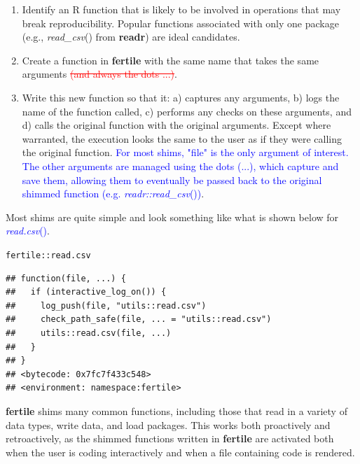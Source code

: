 \documentclass[APA,LATO1COL]{WileyNJD-v2}\usepackage[]{graphicx}\usepackage[]{color}
\makeatletter
\newcommand{\hlopt}[1]{\textcolor[rgb]{0,0,0}{#1}}%
\newcommand{\hlstd}[1]{\textcolor[rgb]{0.345,0.345,0.345}{#1}}%
\newenvironment{kframe}{%
 \def\at@end@of@kframe{}%
 \ifinner\ifhmode%
  \def\at@end@of@kframe{\end{minipage}}%
  \begin{minipage}{\columnwidth}%
 \fi\fi%
 \def\FrameCommand##1{\hskip\@totalleftmargin \hskip-\fboxsep
 \colorbox{shadecolor}{##1}\hskip-\fboxsep
     \hskip-\linewidth \hskip-\@totalleftmargin \hskip\columnwidth}%
 \MakeFramed {\advance\hsize-\width
   \@totalleftmargin\z@ \linewidth\hsize
   \@setminipage}}%
 {\par\unskip\endMakeFramed%
 \at@end@of@kframe}
\newenvironment{knitrout}{}{} %
\newcommand{\R}{\textsf{R}\xspace}
\newcommand{\pkg}[1]{\textbf{#1}}
\newcommand{\func}[1]{\textit{#1}()}
\makeatother
\begin{document}
\begin{enumerate}[noitemsep]
\item Identify an \R function that is likely to be involved in operations that may break reproducibility. Popular functions associated with only one package (e.g., \func{read\_csv} from \pkg{readr}) are ideal candidates.
\item Create a function in \pkg{fertile} with the same name that takes the same arguments \textcolor{red}{\st{(and always the dots ...)}}.
\item Write this new function so that it: a) captures any arguments, b) logs the name of the function called, c) performs any checks on these arguments, and d) calls the original function with the original arguments. Except where warranted, the execution looks the same to the user as if they were calling the original function. \textcolor{blue}{For most shims, "file" is the only argument of interest. The other arguments are managed using the dots (...), which capture and save them, allowing them to eventually be passed back to the original shimmed function (e.g. \func{readr::read\_csv})}.

\end{enumerate}
Most shims are quite simple and look something like what is shown below for \textcolor{blue}{\func{read.csv}}. 

\begin{knitrout}
\color{fgcolor}\begin{kframe}
\begin{alltt}
\hlstd{fertile}\hlopt{::}\hlstd{read.csv}
\end{alltt}
\begin{verbatim}
## function(file, ...) {
##   if (interactive_log_on()) {
##     log_push(file, "utils::read.csv")
##     check_path_safe(file, ... = "utils::read.csv")
##     utils::read.csv(file, ...)
##   }
## }
## <bytecode: 0x7fc7f433c548>
## <environment: namespace:fertile>
\end{verbatim}
\end{kframe}
\end{knitrout}

\pkg{fertile} shims many common functions, including those that read in a variety of data types, write data, and load packages. This works both proactively and retroactively, as the shimmed functions written in \pkg{fertile} are activated both when the user is coding interactively and when a file containing code is rendered.
\end{document}
